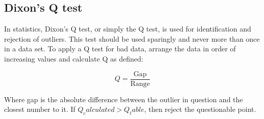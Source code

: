 \subsection{Dixon's Q test}

In statistics, Dixon's Q test, or simply the Q test, is used for identification and rejection of outliers. This test should be used sparingly and never more than once in a data set. To apply a Q test for bad data, arrange the data in order of increasing values and calculate Q as defined:

\begin{equation}
Q = \frac{\mbox{Gap}}{\mbox{Range}}
\end{equation}

Where gap is the absolute difference between the outlier in question and the closest number to it. If $Q_calculated > Q_table$, then reject the questionable point.
